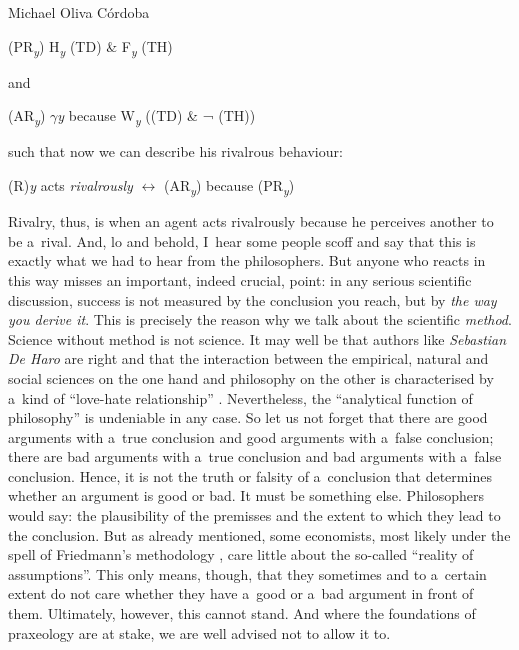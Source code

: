 \begin{artengenv}{Michael Oliva Córdoba}
\medskip

\noindent (PR\textit{\textsubscript{y}}) H\textit{\textsubscript{y}} (TD) \& F\textit{\textsubscript{y}} (TH)



\medskip

\noindent and



\medskip

\noindent (AR\textit{\textsubscript{y}}) \textit{$\gamma $y} because W\textit{\textsubscript{y}} ((TD) \& ¬ (TH))



\medskip

\noindent such that now we can describe his rivalrous behaviour:



\medskip

\noindent (R)\textit{y} acts \textit{rivalrously} $\leftrightarrow$ (AR\textit{\textsubscript{y}}) because (PR\textit{\textsubscript{y}})



\medskip

\noindent Rivalry, thus, is when an agent acts rivalrously because he perceives another to be a~rival. And, lo and behold, I~hear some people scoff and say that this is exactly what we had to hear from the philosophers. But anyone who reacts in this way misses an important, indeed crucial, point: in any serious scientific discussion, success is not measured by the conclusion you reach, but by \textit{the way you derive it}. This is precisely the reason why we talk about the scientific \textit{method}. Science without method is not science. It may well be that authors like \textit{Sebastian De Haro} are right and that the interaction between the empirical, natural and social sciences on the one hand and philosophy on the other is characterised by a~kind of ``love-hate relationship'' 
\parencite[][]{de_haro_science_2020}. %
 Nevertheless, the ``analytical function of philosophy'' 
\parencite[][p.304f.]{de_haro_science_2020} %
 is undeniable in any case. So let us not forget that there are good arguments with a~true conclusion and good arguments with a~false conclusion; there are bad arguments with a~true conclusion and bad arguments with a~false conclusion. Hence, it is not the truth or falsity of a~conclusion that determines whether an argument is good or bad. It must be something else. Philosophers would say: the plausibility of the premisses and the extent to which they lead to the conclusion. But as already mentioned, some economists, most likely under the spell of Friedmann's methodology 
\parencite[][14f.]{friedman_methodology_1966},%
care little about the so-called ``reality of assumptions''. This only means, though, that they sometimes and to a~certain extent do not care whether they have a~good or a~bad argument in front of them. Ultimately, however, this cannot stand. And where the foundations of praxeology are at stake, we are well advised not to allow it to.




\end{artengenv}
